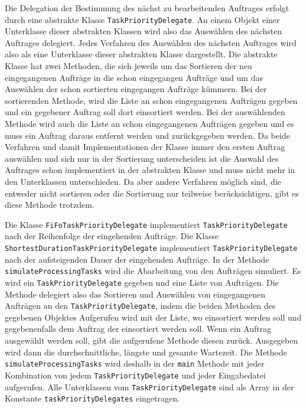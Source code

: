 \documentclass[a4paper,10pt,ngerman]{scrartcl}
\begin{document}
	      Die Delegation der Bestimmung des nächst zu bearbeitenden Auftrages erfolgt
	      durch eine abstrakte Klasse \texttt{TaskPriorityDelegate}.
	      An einem Objekt einer Unterklasse dieser abstrakten Klassen wird
	      also das Auswählen des nächsten Auftrages delegiert.
	      Jedes Verfahren des Auswählen des nächsten Auftrages wird
	      also als eine Unterklasse dieser abstrakten Klasse dargestellt.
	Die abstrakte Klasse hat zwei Methoden, die sich jeweils um das Sortieren
	      der neu eingegangenen Aufträge in die schon eingegangen Aufträge
	      und um das Auswählen der schon sortierten eingegangen Aufträge kümmern.
	      Bei der sortierenden Methode, wird die Liste an schon eingegangenen Aufträgen gegeben
	      und ein gegebener Auftrag soll dort einsortiert werden.
	      Bei der auswählenden Methode wird auch die Liste an schon eingegangenen Aufträgen gegeben
	      und es muss ein Auftrag daraus entfernt werden und zurückgegeben werden.
	Da beide Verfahren und damit Implementationen der Klasse immer den ersten Auftrag auswählen
	      und sich nur in der Sortierung unterscheiden ist die Auswahl des Auftrages schon implementiert in der abstrakten Klasse
	      und muss nicht mehr in den Unterklassen unterschieden.
	      Da aber andere Verfahren möglich sind,
	      die entweder nicht sortieren oder die Sortierung nur teilweise berücksichtigen, gibt es diese Methode trotzdem.
	      
	      Die Klasse \texttt{FiFoTaskPriorityDelegate} implementiert \texttt{TaskPriorityDelegate}
	      nach der Reihenfolge der eingehenden Aufträge.
	Die Klasse \texttt{ShortestDurationTaskPriorityDelegate} implementiert \texttt{TaskPriorityDelegate}
	      nach der aufsteigenden Dauer der eingehenden Aufträge.
	In der Methode \texttt{simulateProcessingTasks} wird die Abarbeitung von den Aufträgen simuliert.
	      Es wird ein \texttt{TaskPriorityDelegate} gegeben und eine Liste von Aufträgen.
	      Die Methode delegiert also das Sortieren und Auswählen von eingegangenen Aufträgen
	      an den \texttt{TaskPriorityDelegate},
	      indem die beiden Methoden des gegebenen Objektes Aufgerufen wird
	      mit der Liste, wo einsortiert werden soll
	      und gegebenenfalls dem Auftrag der einsortiert werden soll.
	      Wenn ein Auftrag ausgewählt werden soll, gibt die aufgerufene Methode diesen zurück.
	      Ausgegeben wird dann die durchschnittliche, längste und gesamte Wartezeit.
	Die Methode \texttt{simulateProcessingTasks} wird deshalb in der \texttt{main} Methode
	      mit jeder Kombination von jedem \texttt{TaskPriorityDelegate} und jeder Eingabedatei aufgerufen.
	      Alle Unterklassen vom \texttt{TaskPriorityDelegate} sind als Array
	      in der Konstante \texttt{taskPriorityDelegates} eingetragen.
\end{document}
